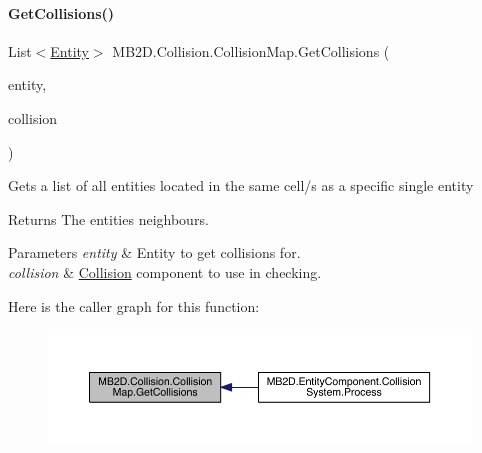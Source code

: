 \paragraph{\texorpdfstring{Get\+Collisions()}{GetCollisions()}}
{\footnotesize\ttfamily List$<$\hyperlink{class_m_b2_d_1_1_entity_component_1_1_entity}{Entity}$>$ M\+B2\+D.\+Collision.\+Collision\+Map.\+Get\+Collisions (\begin{DoxyParamCaption}\item[{\hyperlink{class_m_b2_d_1_1_entity_component_1_1_entity}{Entity}}]{entity,  }\item[{\hyperlink{class_m_b2_d_1_1_entity_component_1_1_collision_component}{Collision\+Component}}]{collision }\end{DoxyParamCaption})\hspace{0.3cm}{\ttfamily [inline]}}



Gets a list of all entities located in the same cell/s as a specific single entity 

\begin{DoxyReturn}{Returns}
The entities neighbours.
\end{DoxyReturn}

\begin{DoxyParams}{Parameters}
{\em entity} & Entity to get collisions for.\\
\hline
{\em collision} & \hyperlink{namespace_m_b2_d_1_1_collision}{Collision} component to use in checking.\\
\hline
\end{DoxyParams}
Here is the caller graph for this function\+:
\nopagebreak
\begin{figure}[H]
\begin{center}
\leavevmode
\includegraphics[width=350pt]{class_m_b2_d_1_1_collision_1_1_collision_map_acbc6d9d9bb85342cf8f07c22f6947b27_icgraph}
\end{center}
\end{figure}
\hypertarget{class_m_b2_d_1_1_collision_1_1_collision_map_adb3b318fb729bd02cda21a450e504465}{}\label{class_m_b2_d_1_1_collision_1_1_collision_map_adb3b318fb729bd02cda21a450e504465} 
